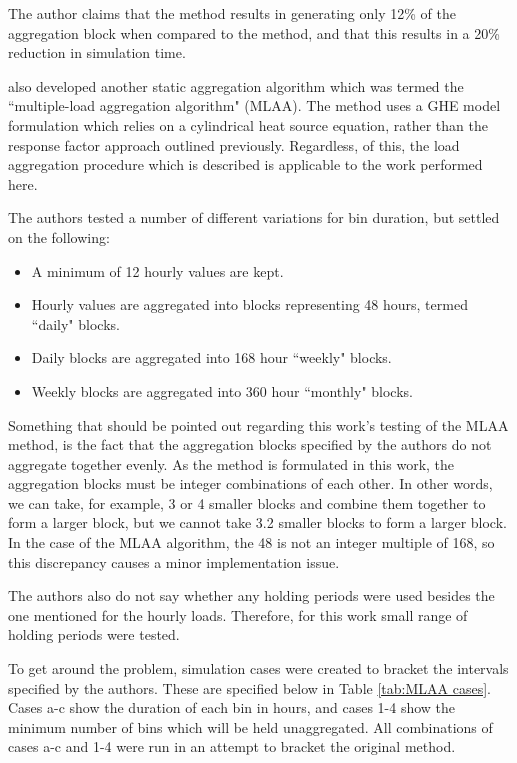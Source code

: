 \documentclass[review,12pt]{elsarticle}
\begin{document}
The author claims that the method results in generating only 12\% of the aggregation block when compared to the \cite{YavuzturkSpitler1999} method, and that this results in a 20\% reduction in simulation time.

\cite{BernierPinelLabibPaillot2004} also developed another static aggregation algorithm which was termed the ``multiple-load aggregation algorithm" (MLAA). The method uses a GHE model formulation which relies on a cylindrical heat source equation, rather than the response factor approach outlined previously. Regardless, of this, the load aggregation procedure which is described is applicable to the work performed here.

The authors tested a number of different variations for bin duration, but settled on the following:

\begin{itemize}
    \item A minimum of 12 hourly values are kept.
    
    \item Hourly values are aggregated into blocks representing 48 hours, termed ``daily" blocks.

    \item Daily blocks are aggregated into 168 hour ``weekly" blocks.
    
    \item Weekly blocks are aggregated into 360 hour ``monthly" blocks.

\end{itemize}

Something that should be pointed out regarding this work's testing of the MLAA method, is the fact that the aggregation blocks specified by the authors do not aggregate together evenly. As the method is formulated in this work, the aggregation blocks must be integer combinations of each other. In other words, we can take, for example, 3 or 4 smaller blocks and combine them together to form a larger block, but we cannot take 3.2 smaller blocks to form a larger block. In the case of the MLAA algorithm, the 48 is not an integer multiple of 168, so this discrepancy causes a minor implementation issue. 

The authors also do not say whether any holding periods were used besides the one mentioned for the hourly loads. Therefore, for this work small range of holding periods were tested.

To get around the problem, simulation cases were created to bracket the intervals specified by the authors. These are specified below in Table \ref{tab:MLAA cases}. Cases a-c show the duration of each bin in hours, and cases 1-4 show the minimum number of bins which will be held unaggregated. All combinations of cases a-c and 1-4 were run in an attempt to bracket the original method.
\end{document}
